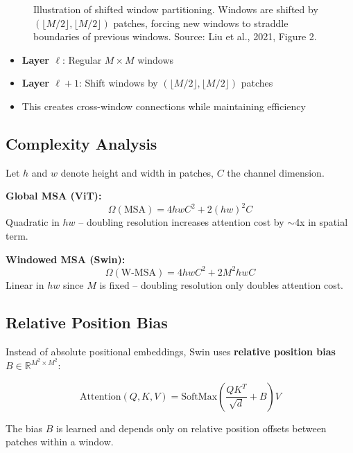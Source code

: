 \documentclass{article}
\begin{document}
\begin{figure}[h]
\centering
{}
\caption{Illustration of shifted window partitioning. Windows are shifted by $(\lfloor M/2 \rfloor, \lfloor M/2 \rfloor)$ patches, forcing new windows to straddle boundaries of previous windows. Source: Liu et al., 2021, Figure 2.}
\end{figure}

\begin{itemize}
\item \textbf{Layer $\ell$}: Regular $M \times M$ windows
\item \textbf{Layer $\ell+1$}: Shift windows by $(\lfloor M/2 \rfloor, \lfloor M/2 \rfloor)$ patches
\item This creates cross-window connections while maintaining efficiency
\end{itemize}

\subsection{Complexity Analysis}

Let $h$ and $w$ denote height and width in patches, $C$ the channel dimension.

\textbf{Global MSA (ViT):}
\begin{equation}
\Omega(\text{MSA}) = 4hwC^2 + 2(hw)^2 C
\end{equation}
Quadratic in $hw$ -- doubling resolution increases attention cost by $\sim$4x in spatial term.

\textbf{Windowed MSA (Swin):}
\begin{equation}
\Omega(\text{W-MSA}) = 4hwC^2 + 2M^2 hwC
\end{equation}
Linear in $hw$ since $M$ is fixed -- doubling resolution only doubles attention cost.

\subsection{Relative Position Bias}

Instead of absolute positional embeddings, Swin uses \textbf{relative position bias} $B \in \mathbb{R}^{M^2 \times M^2}$:

\begin{equation}
\text{Attention}(Q, K, V) = \text{SoftMax}\left(\frac{QK^T}{\sqrt{d}} + B\right)V
\end{equation}

The bias $B$ is learned and depends only on relative position offsets between patches within a window.
\end{document}
